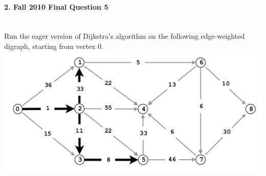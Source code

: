 \documentclass{article}
\begin{document}
\paragraph{\Large 2. Fall 2010 Final Question 5}\mbox{}\\
Run the eager version of Dijkstra’s algorithm on the following edge-weighted digraph, starting from vertex 0.\\
\includegraphics[]{fin-f10-5.png}
\end{document}
